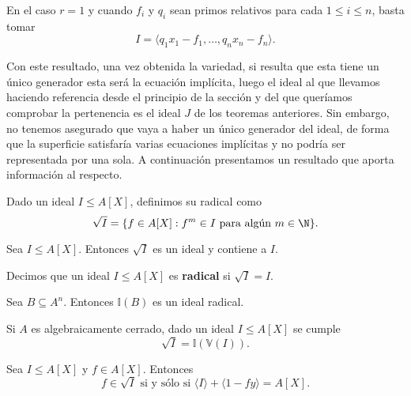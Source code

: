 \begin{observacion}
    En el caso $r=1$ y cuando $f_i$ y $q_i$ sean primos relativos para cada $1\le i \le n$, basta tomar
    $$I = \langle q_1x_1-f_1,\dots,  q_nx_n-f_n\rangle.$$
\end{observacion}

Con este resultado, una vez obtenida la variedad, si resulta que esta tiene un único generador esta será la ecuación implícita, luego el ideal al que llevamos haciendo referencia desde el principio de la sección y del que queríamos comprobar la pertenencia es el ideal $J$ de los teoremas anteriores. Sin embargo, no tenemos asegurado que vaya a haber un único generador del ideal, de forma que la superficie satisfaría varias ecuaciones implícitas y no podría ser representada por una sola. A continuación presentamos un resultado que aporta información al respecto.

\begin{definicion}
    Dado un ideal $I\le A[X]$, definimos su radical como
    \begin{equation*}
        \sqrt{I} = \{f\in A[X] : f^m\in I \text{ para algún } m\in \N\}.
    \end{equation*}
\end{definicion}
\begin{proposicion}
    Sea $I\le A[X]$. Entonces $\sqrt{I}$ es un ideal y contiene a $I$.
\end{proposicion}
\begin{definicion}
    Decimos que un ideal $I\le A[X]$ es \textbf{radical} si $\sqrt{I} = I$.
\end{definicion}

\begin{proposicion}
    Sea $B\subseteq A^n$. Entonces $\mathbb{I}(B)$ es un ideal radical.
\end{proposicion}
\begin{teorema}
    Si $A$ es algebraicamente cerrado, dado un ideal $I\le A[X]$ se cumple
    \begin{equation*}
        \sqrt{I} = \mathbb{I}(\mathbb{V}(I)).
    \end{equation*}
\end{teorema}
\begin{proposicion}
    Sea $I\le A[X]$ y $f\in A[X]$. Entonces
    \begin{equation*}
        f\in \sqrt{I} \text{ si y sólo si } \langle I \rangle + \langle 1-fy \rangle = A[X].
    \end{equation*}
\end{proposicion}

